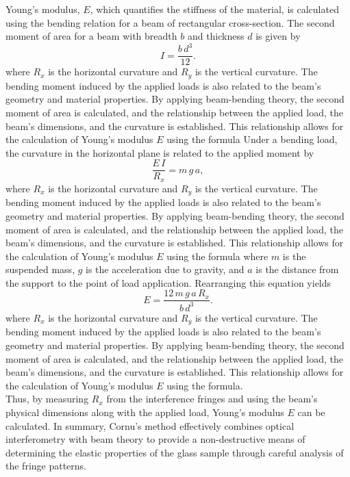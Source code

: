 \documentclass[a4paper,11pt]{article}
\begin{document}
Young's modulus, \(E\), which quantifies the stiffness of the material, is calculated using the bending relation for a beam of rectangular cross-section. The second moment of area for a beam with breadth \(b\) and thickness \(d\) is given by
\begin{equation}
I = \frac{b \, d^3}{12}.
\end{equation}
where \(R_x\) is the horizontal curvature and \(R_y\) is the vertical curvature. The bending moment induced by the applied loads is also related to the beam's geometry and material properties. By applying beam-bending theory, the second moment of area is calculated, and the relationship between the applied load, the beam's dimensions, and the curvature is established. This relationship allows for the calculation of Young's modulus \(E\) using the formula
Under a bending load, the curvature in the horizontal plane is related to the applied moment by
\begin{equation}
\frac{E\,I}{R_x} = m \, g \, a,
\end{equation}
where \(R_x\) is the horizontal curvature and \(R_y\) is the vertical curvature. The bending moment induced by the applied loads is also related to the beam's geometry and material properties. By applying beam-bending theory, the second moment of area is calculated, and the relationship between the applied load, the beam's dimensions, and the curvature is established. This relationship allows for the calculation of Young's modulus \(E\) using the formula
where \(m\) is the suspended mass, \(g\) is the acceleration due to gravity, and \(a\) is the distance from the support to the point of load application. Rearranging this equation yields
\begin{equation}
E = \frac{12 \, m \, g \, a \, R_x}{b\, d^3}.
\end{equation}
where \(R_x\) is the horizontal curvature and \(R_y\) is the vertical curvature. The bending moment induced by the applied loads is also related to the beam's geometry and material properties. By applying beam-bending theory, the second moment of area is calculated, and the relationship between the applied load, the beam's dimensions, and the curvature is established. This relationship allows for the calculation of Young's modulus \(E\) using the formula.\\

Thus, by measuring \(R_x\) from the interference fringes and using the beam's physical dimensions along with the applied load, Young's modulus \(E\) can be calculated. In summary, Cornu's method effectively combines optical interferometry with beam theory to provide a non-destructive means of determining the elastic properties of the glass sample through careful analysis of the fringe patterns.
\end{document}
